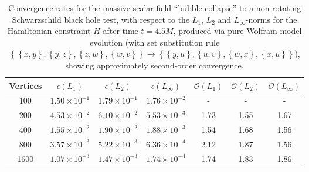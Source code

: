 \documentclass{article}
\begin{document}
\begin{table}[ht]
\centering
\begin{tabular}{|c|c|c|c|c|c|c|}
\hline
Vertices & ${\epsilon \left( L_1 \right)}$ & ${\epsilon \left( L_2 \right)}$ & ${\epsilon \left( L_{\infty} \right)}$ & ${\mathcal{O} \left( L_1 \right)}$ & ${\mathcal{O} \left( L_2 \right)}$ & ${\mathcal{O} \left( L_{\infty} \right)}$\\
\hline\hline
100 & ${1.50 \times 10^{-1}}$ & ${1.79 \times 10^{-1}}$ & ${1.76 \times 10^{-2}}$ & - & - & -\\
\hline
200 & ${4.53 \times 10^{-2}}$ & ${6.10 \times 10^{-2}}$ & ${5.53 \times 10^{-3}}$ & 1.73 & 1.55 & 1.67\\
\hline
400 & ${1.55 \times 10^{-2}}$ & ${1.90 \times 10^{-2}}$ & ${1.88 \times 10^{-3}}$ & 1.54  & 1.68 & 1.56\\
\hline
800 & ${3.57 \times 10^{-3}}$ & ${5.22 \times 10^{-3}}$ & ${6.36 \times 10^{-4}}$ & 2.12 & 1.87  & 1.56\\
\hline
1600 & ${1.07 \times 10^{-3}}$ & ${1.47 \times 10^{-3}}$ & ${1.74 \times 10^{-4}}$ & 1.74 & 1.83 & 1.86\\
\hline
\end{tabular}
\caption{Convergence rates for the massive scalar field ``bubble collapse'' to a non-rotating Schwarzschild black hole test, with respect to the ${L_1}$, ${L_2}$ and ${L_{\infty}}$-norms for the Hamiltonian constraint $H$ after time ${t = 4.5 M}$, produced via pure Wolfram model evolution (with set substitution rule ${\left\lbrace \left\lbrace x, y \right\rbrace, \left\lbrace y, z \right\rbrace, \left\lbrace z, w \right\rbrace, \left\lbrace w, v \right\rbrace \right\rbrace \to \left\lbrace \left\lbrace y, u \right\rbrace, \left\lbrace u, v \right\rbrace, \left\lbrace w, x \right\rbrace, \left\lbrace x, u \right\rbrace \right\rbrace}$), showing approximately second-order convergence.}
\label{tab:Table3}
\end{table}
\end{document}
